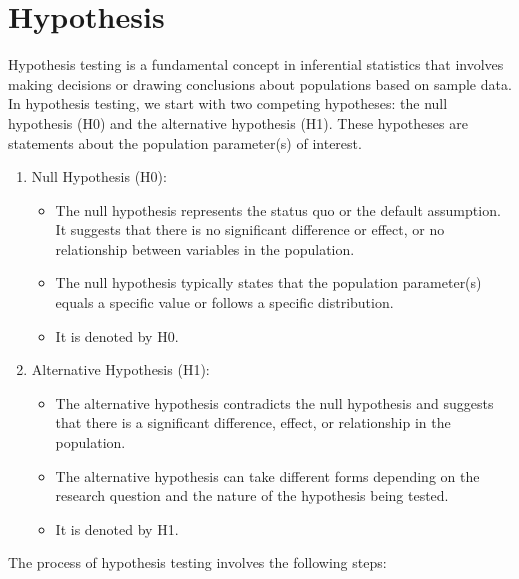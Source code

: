 \documentclass[
]{book}
\providecommand{\tightlist}{%
  \setlength{\itemsep}{0pt}\setlength{\parskip}{0pt}}
\begin{document}
\hypertarget{hypothesis}{%
\section{Hypothesis}\label{hypothesis}}

Hypothesis testing is a fundamental concept in inferential statistics that involves making decisions or drawing conclusions about populations based on sample data. In hypothesis testing, we start with two competing hypotheses: the null hypothesis (H0) and the alternative hypothesis (H1). These hypotheses are statements about the population parameter(s) of interest.

\begin{enumerate}
\def\labelenumi{\arabic{enumi}.}
\tightlist
\item
  Null Hypothesis (H0):

  \begin{itemize}
  \tightlist
  \item
    The null hypothesis represents the status quo or the default assumption. It suggests that there is no significant difference or effect, or no relationship between variables in the population.
  \item
    The null hypothesis typically states that the population parameter(s) equals a specific value or follows a specific distribution.
  \item
    It is denoted by H0.
  \end{itemize}
\item
  Alternative Hypothesis (H1):

  \begin{itemize}
  \tightlist
  \item
    The alternative hypothesis contradicts the null hypothesis and suggests that there is a significant difference, effect, or relationship in the population.
  \item
    The alternative hypothesis can take different forms depending on the research question and the nature of the hypothesis being tested.
  \item
    It is denoted by H1.
  \end{itemize}
\end{enumerate}

The process of hypothesis testing involves the following steps:
\end{document}
